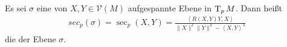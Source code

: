 \begin{Dfn}
  Es sei $\sigma$ eine von $X,Y \in \mathcal V(M)$ aufgespannte Ebene in $\operatorname{T}_pM$.
Dann heißt 
\begin{align*}
  sec_p(\sigma) = \sec_p(X,Y) = \frac{\left<R(X,Y)Y,X\right>}{\|X\|^2\|Y\|^2 - \left<X,Y\right>^2}
\end{align*}
die  der Ebene $\sigma$.
\end{Dfn}


